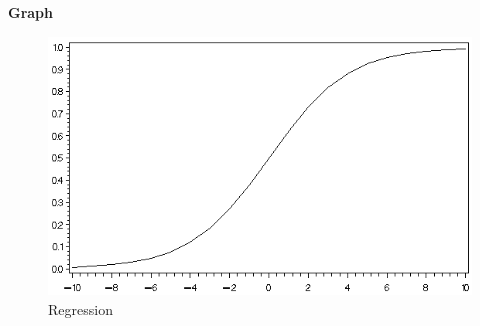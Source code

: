 \documentclass[12pt]{article}
\begin{document}
\textbf {Graph\\}

\begin{figure}
\caption{Regression}
\includegraphics{graph.PNG}

\end{figure}
\end{document}
